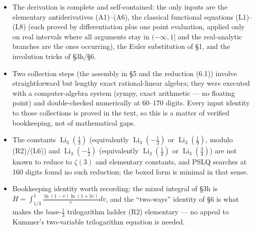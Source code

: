 \documentclass[11pt]{article}
\theoremstyle{remark}
\begin{document}
\begin{itemize}
\item The derivation is complete and self-contained: the only inputs are the elementary antiderivatives (A1)--(A6), the classical functional equations (L1)--(L8) (each proved by differentiation plus one point evaluation, applied only on real intervals where all arguments stay in $(-\infty,1]$ and the real-analytic branches are the ones occurring), the Euler substitution of \S1, and the involution tricks of \S3h/\S6.
\item Two collection steps (the assembly in \S5 and the reduction (6.1)) involve straightforward but lengthy exact rational-linear algebra; they were executed with a computer-algebra system (sympy, exact arithmetic --- no floating point) and double-checked numerically at 60--170 digits. Every input identity to those collections is proved in the text, so this is a matter of verified bookkeeping, not of mathematical gaps.
\item The constants $\operatorname{Li}_3(\frac13)$ (equivalently $\operatorname{Li}_3(-\frac13)$ or $\operatorname{Li}_3(\frac19)$, modulo (R2)/(L6)) and $\operatorname{Li}_3(-\frac12)$ (equivalently $\operatorname{Li}_3(\frac14)$ or $\operatorname{Li}_3(\frac34)$) are not known to reduce to $\zeta(3)$ and elementary constants, and PSLQ searches at 160 digits found no such reduction; the boxed form is minimal in that sense.
\item Bookkeeping identity worth recording: the mixed integral of \S3h is $H=\int_{1/3}^{1}\frac{\ln(1-v)\ln(1+3v)}{v}dv$, and the ``two-ways'' identity of \S6 is what makes the base-$\frac13$ trilogarithm ladder (R2) elementary --- no appeal to Kummer's two-variable trilogarithm equation is needed.
\end{itemize}
\end{document}
